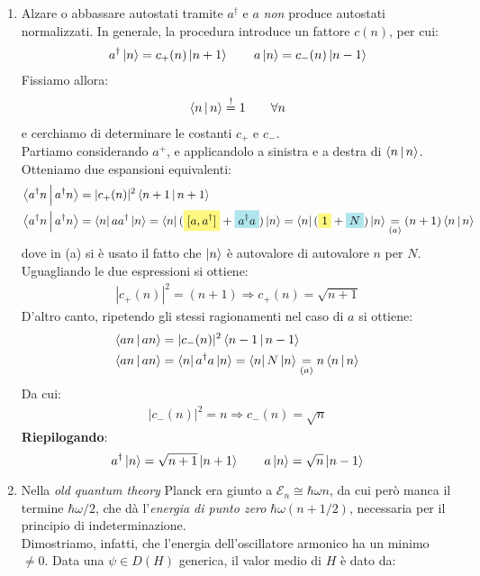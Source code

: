 \documentclass[../../FisicaTeorica.tex]{subfiles}
\begin{document}
\begin{enumerate}
\item Alzare o abbassare autostati tramite $a^\dag$ e $a$ \textit{non} produce autostati normalizzati. In generale, la procedura introduce un fattore $c(n)$, per cui:
\begin{align*}
a^\dag \Ket{n} = c_+(n) \Ket{n+1} \qquad a\Ket{n}=c_-(n)\Ket{n-1}
\end{align*}
Fissiamo allora:
\begin{align*}
\Braket{n|n} \overset{!}{=}1 \qquad \forall n
\end{align*}
e cerchiamo di determinare le costanti $c_+$ e $c_-$.\\
Partiamo considerando $a^+$, e applicandolo a sinistra e a destra di $\Braket{n|n}$. Otteniamo due espansioni equivalenti:
\begin{align*}
\braket{a^\dag n | a^\dag n} &= |c_+(n)|^2 \braket{n+1|n+1}\\
\braket{a^\dag n | a^\dag n} &= \bra{n}a a^\dag \ket{n} = \bra{n}(\hlc{Yellow}{[a,a^\dag]}+\hlc{SkyBlue}{a^\dag a}) \ket{n} = \bra{n}(\hlc{Yellow}{1}+\hlc{SkyBlue}{N})\ket{n} \underset{(a)}{=} (n+1)\braket{n|n}
\end{align*} 
dove in (a) si è usato il fatto che $\Ket{n}$ è autovalore di autovalore $n$ per $N$.\\
Uguagliando le due espressioni si ottiene:
\begin{align*}
|c_+(n)|^2 = (n+1) \Rightarrow c_+(n) = \sqrt{n+1}
\end{align*}
D'altro canto, ripetendo gli stessi ragionamenti nel caso di $a$ si ottiene:
\begin{align*}
\Braket{an|an} &= |c_-(n)|^2 \Braket{n-1|n-1}\\
\Braket{an|an} &= \Bra{n}a^\dag a \Ket{n} = \Bra{n}N\Ket{n} \underset{(a)}{=} n\Braket{n|n}
\end{align*}
Da cui:
\begin{align*}
|c_-(n)|^2 = n \Rightarrow c_-(n) = \sqrt{n}
\end{align*}
\textbf{Riepilogando}:
\[
a^\dag \Ket{n} = \sqrt{n+1}\Ket{n+1}\qquad a\Ket{n}=\sqrt{n}\Ket{n-1}
\]
\item Nella \textit{old quantum theory} Planck era giunto a $\mathcal{E}_n \cong \hbar \omega n$, da cui però manca il termine $\hbar \omega/2$, che dà l'\textit{energia di punto zero} $\hbar \omega (n+1/2)$, necessaria per il principio di indeterminazione.\\
Dimostriamo, infatti, che l'energia dell'oscillatore armonico ha un minimo $\neq 0$. Data una $\psi \in D(H)$ generica, il valor medio di $H$ è dato da:

\end{enumerate}
\end{document}
